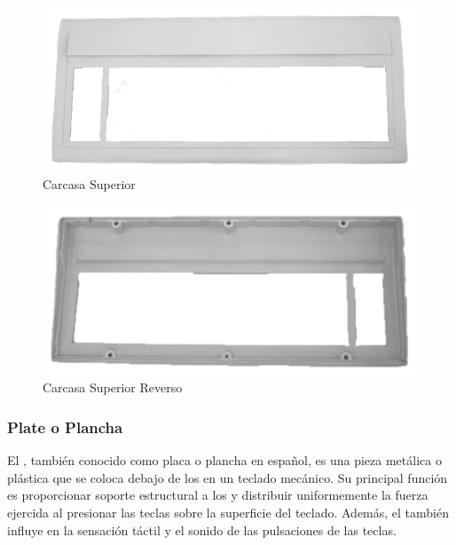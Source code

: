\begin{figure}[H]
    \centering
    \includegraphics[width=1\textwidth]{imagenes/Capitulos/Cap03/TopCase2.png}
    \caption{Carcasa Superior \cite{TopCase2ImageSource}}
    \label{fig:TopCase2}
\end{figure}

\begin{figure}[H]
    \centering
    \includegraphics[width=1\textwidth]{imagenes/Capitulos/Cap03/TopCase1.png}
    \caption{Carcasa Superior Reverso \cite{TopCase1ImageSource}}
    \label{fig:TopCase1}
\end{figure}

\subsubsection{\gls{Plate} o Plancha} \label{DiseñoPlatePCB}

El , también conocido como placa o plancha en español, es una pieza metálica o plástica que se coloca debajo de los  en un teclado mecánico. Su principal función es proporcionar soporte estructural a los  y distribuir uniformemente la fuerza ejercida al presionar las teclas sobre la superficie del teclado. Además, el  también influye en la sensación táctil y el sonido de las pulsaciones de las teclas.

